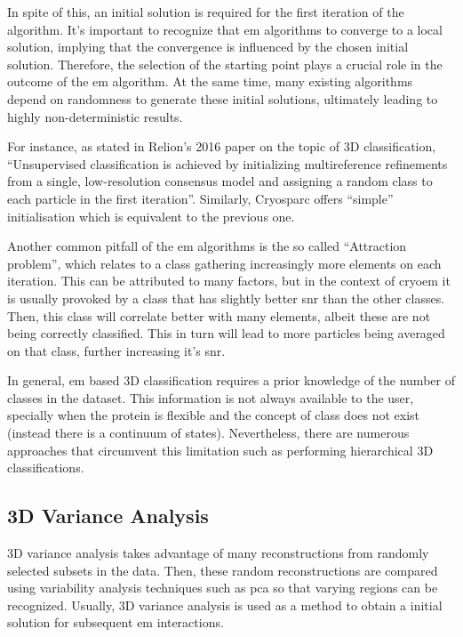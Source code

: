 \documentclass[../main.tex]{subfiles}
\begin{document}
In spite of this, an initial solution is required for the first iteration of the algorithm. It's important to recognize that \gls{em} algorithms to converge to a local solution\cite{meng1997}, implying that the convergence is influenced by the chosen initial solution\cite{sorzano2022}\cite{jonic2016}. Therefore, the selection of the starting point plays a crucial role in the outcome of the \gls{em} algorithm. At the same time, many existing algorithms depend on randomness to generate these initial solutions, ultimately leading to highly non-deterministic results.

For instance, as stated in Relion's 2016 paper on the topic of 3D classification, ``Unsupervised classification is achieved by initializing multireference refinements from a single, low-resolution consensus model and assigning a random class to each particle in the first iteration''\cite{scheres2016}.  Similarly, Cryosparc offers ``simple'' initialisation which is equivalent to the previous one. 

Another common pitfall of the \gls{em} algorithms is the so called ``Attraction problem'', which relates to a class gathering increasingly more elements on each iteration\cite{sorzano2022}\cite{gomezblanco2022}. This can be attributed to many factors, but in the context of \gls{cryoem} it is usually provoked by a class that has slightly better \gls{snr} than the other classes. Then, this class will correlate better with many elements\cite{sorzano2010}\cite{jonic2016}, albeit these are not being correctly classified. This in turn will lead to more particles being averaged on that class, further increasing it's \gls{snr}\cite{sorzano2021}.

In general, \gls{em} based 3D classification requires a prior knowledge of the number of classes in the dataset\cite{jonic2016}. This information is not always available to the user, specially when the protein is flexible and the concept of class does not exist (instead there is a continuum of states). Nevertheless, there are numerous approaches that circumvent this limitation such as performing hierarchical 3D classifications\cite{gomezblanco2022}\cite{zhou2022}.

\subsection{3D Variance Analysis}
3D variance analysis takes advantage of many reconstructions from randomly selected subsets in the data. Then, these random reconstructions are compared using variability analysis techniques such as \gls{pca} so that varying regions can be recognized\cite{penczek2011}. Usually, 3D variance analysis is used as a method to obtain a initial solution for subsequent \gls{em} interactions. 
\end{document}
